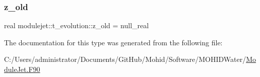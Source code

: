 \mbox{\label{structmodulejet_1_1t__evolution_af05890f0d7517f6a2ccd592b16cc6580}} 
\subsubsection{\texorpdfstring{z\+\_\+old}{z\_old}}
{\footnotesize\ttfamily real modulejet\+::t\+\_\+evolution\+::z\+\_\+old = null\+\_\+real\hspace{0.3cm}{\ttfamily [private]}}



The documentation for this type was generated from the following file\+:\begin{DoxyCompactItemize}
\item 
C\+:/\+Users/administrator/\+Documents/\+Git\+Hub/\+Mohid/\+Software/\+M\+O\+H\+I\+D\+Water/\mbox{\hyperlink{_module_jet_8_f90}{Module\+Jet.\+F90}}\end{DoxyCompactItemize}
